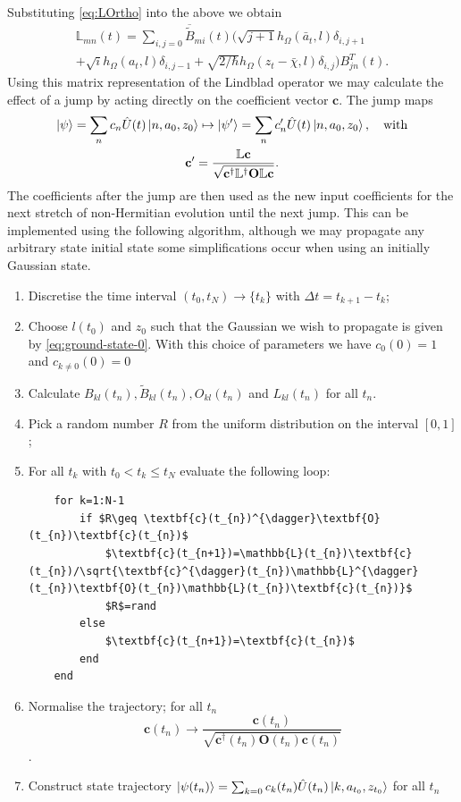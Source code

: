 \documentclass[12pt]{iopart} %
\begin{document}
Substituting \cref{eq:LOrtho} into the above we obtain
\begin{multline}
	\mathbb{L}_{mn}(t)=\sum_{i,j=0}\overline{\widetilde{B}}_{mi}(t)\big(\sqrt{j+1} h_{\Omega}(\bar{a}_t,l) \delta_{i,j+1}\\+\sqrt{i}h_{\Omega} (a_t, l)\delta_{i,j-1}+\sqrt{2/\hbar}  h_{\Omega}(z_t-\bar{\chi},l)\delta_{i,j}\big)B^T_{j n}(t).
\end{multline}
Using this matrix representation of the Lindblad operator we may calculate the effect of a jump by acting directly on the coefficient vector $\mathbf{c}$. The jump maps 
\begin{multline} \label{eqn:Hagjumpcoeffmap}
\ket{\psi}=\sum_n c_n \hat{U}(t)\ket{n,a_0,z_0}\mapsto \ket{\psi'}=\sum_n  c'_n \hat{U}(t)\ket{n,a_0,z_0}, \quad\text{with}\\ \mathbf{c}'=\frac{\mathbb{L} \mathbf{c}}{\sqrt{\mathbf{c}^{\dagger}\mathbb{L}^{\dagger}\mathbf{O} \mathbb{L} \mathbf{c}}}.
\end{multline}
The coefficients after the jump are then used as the new input coefficients for the next stretch of non-Hermitian evolution until the next jump. This can be implemented using the following algorithm, although we may propagate any arbitrary state initial state some simplifications occur when using an initially Gaussian state. 
\begin{enumerate} 
	\item Discretise the time interval $(t_0,t_N) \rightarrow \{t_k \} $ with $\Delta t=t_{k+1}-t_k$;
	\item Choose $l(t_0)$ and $z_0$ such that the Gaussian we wish to propagate is given by \cref{eq:ground-state-0}. With this choice of parameters we have $c_0(0)=1$ and $c_{k\neq0}(0)=0$
	\item Calculate $B_{kl}(t_n),\widetilde{B}_{kl}(t_n),O_{kl}(t_n)$ and $L_{kl}(t_n)$ for all $t_n$.
	\item Pick a random number $R$ from the uniform distribution on the interval $[0,1]$;
	\item For all $t_k$ with $t_0< t_k\leq t_N$ evaluate the following loop:
    \begin{lstlisting}
    for k=1:N-1
        if $R\geq \textbf{c}(t_{n})^{\dagger}\textbf{O}(t_{n})\textbf{c}(t_{n})$ 
            $\textbf{c}(t_{n+1})=\mathbb{L}(t_{n})\textbf{c}(t_{n})/\sqrt{\textbf{c}^{\dagger}(t_{n})\mathbb{L}^{\dagger}(t_{n})\textbf{O}(t_{n})\mathbb{L}(t_{n})\textbf{c}(t_{n})}$
            $R$=rand 
        else 
            $\textbf{c}(t_{n+1})=\textbf{c}(t_{n})$ 
        end
    end
    \end{lstlisting}
    \item Normalise the trajectory; for all $t_n$ $$\mathbf{c}(t_n)\to \frac{\mathbf{c}(t_n)}{\sqrt{\mathbf{c}^{\dagger}(t_n)\mathbf{O}(t_n)\mathbf{c}(t_n)}}$$.
    \item Construct state trajectory $\ket{\psi(t_n)}=\sum_{k=0} c_k(t_n)\hat{U}(t_n)\ket{k,a_{t_0},z_{t_0}}$ for all $t_n$ 
\end{enumerate}
\end{document}
